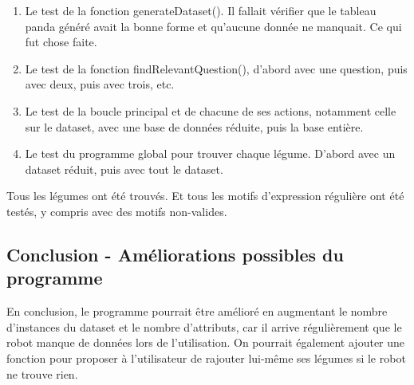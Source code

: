 \documentclass{report}
\begin{document}
\begin{enumerate}
    \item Le test de la fonction generateDataset(). Il fallait vérifier que le tableau panda généré avait la bonne forme et qu'aucune donnée ne manquait. Ce qui fut chose faite.
    \item Le test de la fonction findRelevantQuestion(), d'abord avec une question, puis avec deux, puis avec trois, etc.
    \item Le test de la boucle principal et de chacune de ses actions, notamment celle sur le dataset, avec une base de données réduite, puis la base entière.
    \item Le test du programme global pour trouver chaque légume. D'abord avec un dataset réduit, puis avec tout le dataset.
\end{enumerate}

Tous les légumes ont été trouvés. Et tous les motifs d'expression régulière ont été testés, y compris avec des motifs non-valides.

\subsection{Conclusion - Améliorations possibles du programme}

En conclusion, le programme pourrait être amélioré en augmentant le nombre d'instances du dataset et le nombre d'attributs, car il arrive régulièrement que le robot manque de données lors de l'utilisation. On pourrait également ajouter une fonction pour proposer à l'utilisateur de rajouter lui-même ses légumes si le robot ne trouve rien.
\end{document}
